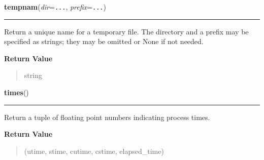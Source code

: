 \hspace{.8\funcindent}\begin{boxedminipage}{\funcwidth}

    \raggedright \textbf{tempnam}(\textit{dir}={\tt ...}, \textit{prefix}={\tt ...})

    \vspace{-1.5ex}

    \rule{\textwidth}{0.5\fboxrule}
\setlength{\parskip}{2ex}
    Return a unique name for a temporary file. The directory and a prefix 
    may be specified as strings; they may be omitted or None if not needed.

\setlength{\parskip}{1ex}
      \textbf{Return Value}
    \vspace{-1ex}

      \begin{quote}
      string

      \end{quote}

    \end{boxedminipage}

    \label{os:times}

    \vspace{0.5ex}

\hspace{.8\funcindent}\begin{boxedminipage}{\funcwidth}

    \raggedright \textbf{times}()

    \vspace{-1.5ex}

    \rule{\textwidth}{0.5\fboxrule}
\setlength{\parskip}{2ex}
    Return a tuple of floating point numbers indicating process times.

\setlength{\parskip}{1ex}
      \textbf{Return Value}
    \vspace{-1ex}

      \begin{quote}
      (utime, stime, cutime, cstime, elapsed\_time)

      \end{quote}

    \end{boxedminipage}

    \label{os:tmpfile}

    \vspace{0.5ex}

